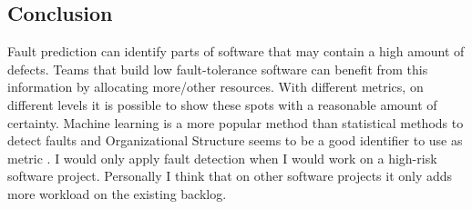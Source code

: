 \subsection*{Conclusion}

Fault prediction can identify parts of software that may contain a high amount of defects.
Teams that build low fault-tolerance software can benefit from this information by allocating more/other resources.
With different metrics, on different levels it is possible to show these spots with a reasonable amount of certainty.
Machine learning is a more popular method than statistical methods to detect faults \autocite[7347]{Catal20097346} and Organizational Structure seems to be a good identifier to use as metric \autocite{MAKING_SOFTWARE}.
I would only apply fault detection when I would work on a high-risk software project.
Personally I think that on other software projects it only adds more workload on the existing backlog.

